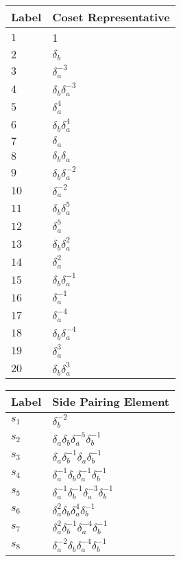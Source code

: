 \documentclass{article}
\begin{document}
\begin{center}
\begin{tabular}{ll}
\toprule
Label & Coset Representative\\
\midrule
$1$ & 1 \\
$2$ & $\delta_b^{}$ \\
$3$ & $\delta_a^{-3}$ \\
$4$ & $\delta_b^{}\delta_a^{-3}$ \\
$5$ & $\delta_a^{4}$ \\
$6$ & $\delta_b^{}\delta_a^{4}$ \\
$7$ & $\delta_a^{}$ \\
$8$ & $\delta_b^{}\delta_a^{}$ \\
$9$ & $\delta_b^{}\delta_a^{-2}$ \\
$10$ & $\delta_a^{-2}$ \\
$11$ & $\delta_b^{}\delta_a^{5}$ \\
$12$ & $\delta_a^{5}$ \\
$13$ & $\delta_b^{}\delta_a^{2}$ \\
$14$ & $\delta_a^{2}$ \\
$15$ & $\delta_b^{}\delta_a^{-1}$ \\
$16$ & $\delta_a^{-1}$ \\
$17$ & $\delta_a^{-4}$ \\
$18$ & $\delta_b^{}\delta_a^{-4}$ \\
$19$ & $\delta_a^{3}$ \\
$20$ & $\delta_b^{}\delta_a^{3}$ \\
\bottomrule
\end{tabular}
\hfill
\begin{tabular}{ll}
\toprule
Label & Side Pairing Element\\
\midrule
$s_{1}$ & $\delta_b^{-2}$ \\
$s_{2}$ & $\delta_a^{}\delta_b^{}\delta_a^{-5}\delta_b^{-1}$ \\
$s_{3}$ & $\delta_a^{}\delta_b^{-1}\delta_a^{}\delta_b^{-1}$ \\
$s_{4}$ & $\delta_a^{-1}\delta_b^{}\delta_a^{-1}\delta_b^{-1}$ \\
$s_{5}$ & $\delta_a^{-1}\delta_b^{-1}\delta_a^{-3}\delta_b^{-1}$ \\
$s_{6}$ & $\delta_a^{2}\delta_b^{}\delta_a^{4}\delta_b^{-1}$ \\
$s_{7}$ & $\delta_a^{2}\delta_b^{-1}\delta_a^{-4}\delta_b^{-1}$ \\
$s_{8}$ & $\delta_a^{-2}\delta_b^{}\delta_a^{-4}\delta_b^{-1}$ \\

\end{tabular}
\end{center}
\end{document}
